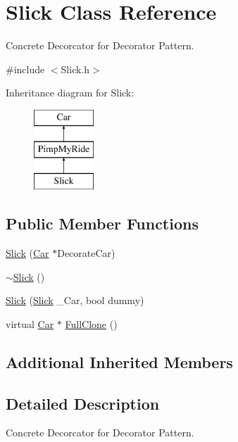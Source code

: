 \hypertarget{class_slick}{}\section{Slick Class Reference}
\label{class_slick}


Concrete Decorcator for Decorator Pattern.  




{\ttfamily \#include $<$Slick.\+h$>$}

Inheritance diagram for Slick\+:\begin{figure}[H]
\begin{center}
\leavevmode
\includegraphics[height=3.000000cm]{class_slick}
\end{center}
\end{figure}
\subsection*{Public Member Functions}
\begin{DoxyCompactItemize}
\item 
\mbox{\hyperlink{class_slick_ac66212273efddd6697d2042d6c2f9f9a}{Slick}} (\mbox{\hyperlink{class_car}{Car}} $\ast$Decorate\+Car)
\item 
\mbox{\hyperlink{class_slick_a3b059145c3c0aa3dafd0f39f80298f3b}{$\sim$\+Slick}} ()
\item 
\mbox{\hyperlink{class_slick_ae34f904b44d660b2cba1b9ae71139d2e}{Slick}} (\mbox{\hyperlink{class_slick}{Slick}} \+\_\+\+Car, bool dummy)
\item 
virtual \mbox{\hyperlink{class_car}{Car}} $\ast$ \mbox{\hyperlink{class_slick_a09178f75aaba34e79992c66eac80974e}{Full\+Clone}} ()
\end{DoxyCompactItemize}
\subsection*{Additional Inherited Members}


\subsection{Detailed Description}
Concrete Decorcator for Decorator Pattern. 

